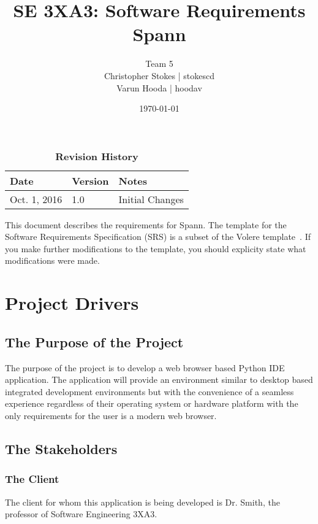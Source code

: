 \documentclass[12pt, titlepage]{article}
\title{SE 3XA3: Software Requirements\\Spann}
\author{Team 5
		\\ Christopher Stokes | stokescd
		\\ Varun Hooda | hoodav
}
\date{\today}
\begin{document}
\maketitle

\tableofcontents
\listoftables
\listoffigures

\begin{table}[bp]
\caption{\bf Revision History}
\begin{tabularx}{\textwidth}{p{3cm}p{2cm}X}
\toprule {\bf Date} & {\bf Version} & {\bf Notes}\\
\midrule
Oct. 1, 2016 & 1.0 & Initial Changes\\
\bottomrule
\end{tabularx}
\end{table}

\newpage


This document describes the requirements for Spann.  The template for the Software
Requirements Specification (SRS) is a subset of the Volere
template~\citep{RobertsonAndRobertson2012}.  If you make further modifications
to the template, you should explicity state what modifications were made.

\section{Project Drivers}

  \subsection{The Purpose of the Project}
  The purpose of the project is to develop a web browser based Python IDE
  application. The application will provide an environment similar to desktop
  based integrated development environments but with the convenience of a
  seamless experience regardless of their operating system or hardware platform
  with the only requirements for the user is a modern web browser.

  \subsection{The Stakeholders}

    \subsubsection{The Client}
    The client for whom this application is being developed is Dr. Smith, the
    professor of Software Engineering 3XA3.
\end{document}
